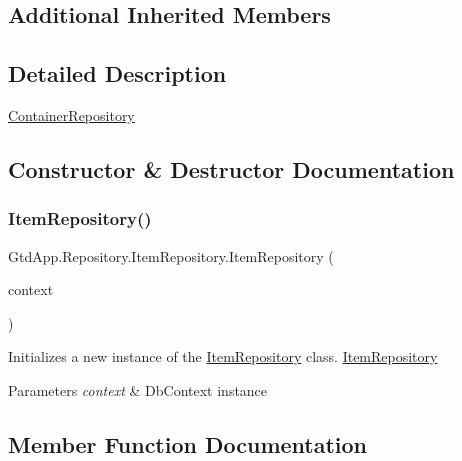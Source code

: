 \subsection*{Additional Inherited Members}


\subsection{Detailed Description}
\mbox{\hyperlink{class_gtd_app_1_1_repository_1_1_container_repository}{Container\+Repository}} 



\subsection{Constructor \& Destructor Documentation}
\mbox{\label{class_gtd_app_1_1_repository_1_1_item_repository_ad85f0deb2de0b43783988f9491e42945}} 
\subsubsection{\texorpdfstring{Item\+Repository()}{ItemRepository()}}
{\footnotesize\ttfamily Gtd\+App.\+Repository.\+Item\+Repository.\+Item\+Repository (\begin{DoxyParamCaption}\item[{\mbox{\hyperlink{class_gtd_app_1_1_data_1_1_gtd_entity_data_model}{Gtd\+Entity\+Data\+Model}}}]{context }\end{DoxyParamCaption})}



Initializes a new instance of the \mbox{\hyperlink{class_gtd_app_1_1_repository_1_1_item_repository}{Item\+Repository}} class. \mbox{\hyperlink{class_gtd_app_1_1_repository_1_1_item_repository}{Item\+Repository}} 


\begin{DoxyParams}{Parameters}
{\em context} & Db\+Context instance\\
\hline
\end{DoxyParams}


\subsection{Member Function Documentation}
\mbox{\label{class_gtd_app_1_1_repository_1_1_item_repository_a5238d94f8e5449fb298b2fa9888b4247}} 
